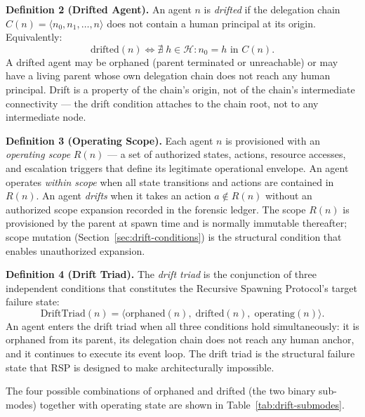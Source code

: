 \medskip
\noindent\textbf{Definition 2 (Drifted Agent).}
An agent $n$ is \emph{drifted} if the delegation chain $C(n) = \langle n_0, n_1, \ldots, n \rangle$ does not contain a human principal at its origin. Equivalently:
\begin{equation}
\text{drifted}(n) \iff \nexists\; h \in \mathcal{H} : n_0 = h \text{ in } C(n).
\label{eq:drifted-def}
\end{equation}
A drifted agent may be orphaned (parent terminated or unreachable) or may have a living parent whose own delegation chain does not reach any human principal. Drift is a property of the chain's origin, not of the chain's intermediate connectivity — the drift condition attaches to the chain root, not to any intermediate node.

\medskip
\noindent\textbf{Definition 3 (Operating Scope).}
Each agent $n$ is provisioned with an \emph{operating scope} $R(n)$ — a set of authorized states, actions, resource accesses, and escalation triggers that define its legitimate operational envelope. An agent operates \emph{within scope} when all state transitions and actions are contained in $R(n)$. An agent \emph{drifts} when it takes an action $a \notin R(n)$ without an authorized scope expansion recorded in the forensic ledger. The scope $R(n)$ is provisioned by the parent at spawn time and is normally immutable thereafter; scope mutation (Section~\ref{sec:drift-conditions}) is the structural condition that enables unauthorized expansion.

\medskip
\noindent\textbf{Definition 4 (Drift Triad).}
The \emph{drift triad} is the conjunction of three independent conditions that constitutes the Recursive Spawning Protocol's target failure state:
\begin{equation}
\text{DriftTriad}(n) = \langle \text{orphaned}(n),\; \text{drifted}(n),\; \text{operating}(n) \rangle.
\label{eq:drift-triad}
\end{equation}
An agent enters the drift triad when all three conditions hold simultaneously: it is orphaned from its parent, its delegation chain does not reach any human anchor, and it continues to execute its event loop. The drift triad is the structural failure state that RSP is designed to make architecturally impossible.

The four possible combinations of orphaned and drifted (the two binary sub-modes) together with operating state are shown in Table~\ref{tab:drift-submodes}.

